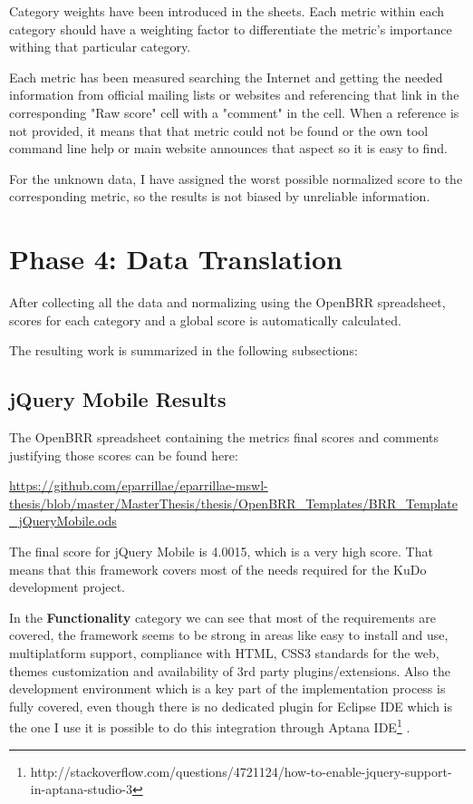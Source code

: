 \documentclass[a4paper,12pt]{book}
\begin{document}
Category weights have been introduced in the sheets. Each metric within each category should have a weighting factor to differentiate the metric's importance withing that particular category. 

Each metric has been measured searching the Internet and getting the needed information from official mailing lists or websites and referencing that link in the corresponding "Raw score" cell with a "comment" in the cell. When a reference is not provided, it means that that metric could not be found or the own tool command line help or main website announces that aspect so it is easy to find.

For the unknown data, I have assigned the worst possible normalized score to the corresponding metric, so the results is not biased by unreliable information.

\section{Phase 4: Data Translation}
\label{sec:phase4}

After collecting all the data and normalizing using the OpenBRR spreadsheet, scores for each category and a global score is automatically calculated.

The resulting work is summarized in the following subsections:

\subsection{jQuery Mobile Results}
\label{jQuery Mobile Results}

The OpenBRR spreadsheet containing the metrics final scores and comments justifying those scores can be found here:

\url{
https://github.com/eparrillae/eparrillae-mswl-thesis/blob/master/MasterThesis/thesis/OpenBRR_Templates/BRR_Template_jQueryMobile.ods}

The final score for jQuery Mobile is 4.0015, which is a very high score. That means that this framework covers most of the needs required for the KuDo development project.

In the \textbf{Functionality} category we can see that most of the requirements are covered, the framework seems to be strong in areas like easy to install and use, multiplatform support, compliance with HTML, CSS3 standards for the web, themes customization and availability of 3rd party plugins/extensions. Also the development environment which is a key part of the implementation process is fully covered, even though there is no dedicated plugin for Eclipse IDE which is the one I use it is possible to do this integration through Aptana IDE\footnote{http://stackoverflow.com/questions/4721124/how-to-enable-jquery-support-in-aptana-studio-3} .
\end{document}
